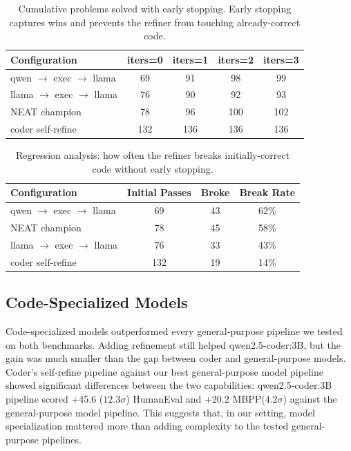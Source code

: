 \documentclass{article}
\begin{document}
\begin{table}[h]
\centering
\caption{Cumulative problems solved with early stopping. Early stopping captures wins and prevents the refiner from touching already-correct code.}
\label{tab:early-stopping}
\begin{tabular}{lcccc}
\hline
\textbf{Configuration} & \textbf{iters=0} & \textbf{iters=1} & \textbf{iters=2} & \textbf{iters=3} \\
\hline
qwen $\rightarrow$ exec $\rightarrow$ llama & 69 & 91 & 98 & 99 \\
llama $\rightarrow$ exec $\rightarrow$ llama & 76 & 90 & 92 & 93 \\
NEAT champion & 78 & 96 & 100 & 102 \\
coder self-refine & 132 & 136 & 136 & 136 \\
\hline
\end{tabular}
\end{table}

\begin{table}[h]
\centering
\caption{Regression analysis: how often the refiner breaks initially-correct code without early stopping.}
\label{tab:regressions}
\begin{tabular}{lccc}
\hline
\textbf{Configuration} & \textbf{Initial Passes} & \textbf{Broke} & \textbf{Break Rate} \\
\hline
qwen $\rightarrow$ exec $\rightarrow$ llama & 69 & 43 & 62\% \\
NEAT champion & 78 & 45 & 58\% \\
llama $\rightarrow$ exec $\rightarrow$ llama & 76 & 33 & 43\% \\
coder self-refine & 132 & 19 & 14\% \\
\hline
\end{tabular}
\end{table}

\subsection{Code-Specialized Models}
Code-specialized models outperformed every general-purpose pipeline we tested on both benchmarks. Adding refinement still helped qwen2.5-coder:3B, but the gain was much smaller than the gap between coder and general-purpose models. Coder's self-refine pipeline against our best general-purpose model pipeline showed significant differences between the two capabilities: qwen2.5-coder:3B pipeline scored +45.6 ($12.3\sigma$) HumanEval and +20.2 MBPP($4.2\sigma$) against the general-purpose model pipeline. This suggests that, in our setting, model specialization mattered more than adding complexity to the tested general-purpose pipelines.
\end{document}

